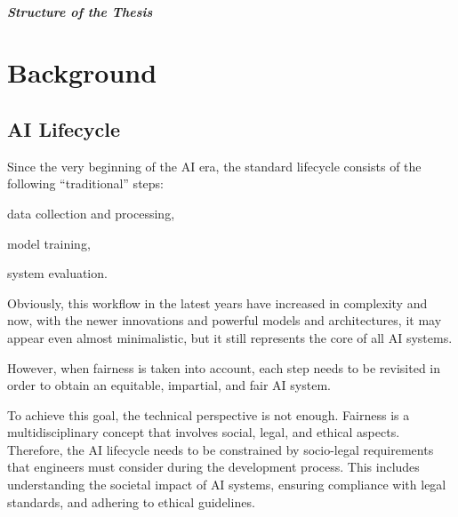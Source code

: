 \documentclass[12pt,a4paper,openright,twoside]{book}
\begin{document}
\paragraph{Structure of the Thesis}


\chapter{Background}\label{chap:background}



\section{\ac{AI} Lifecycle}


Since the very beginning of the \ac{AI} era, the standard lifecycle consists of the following ``traditional'' steps:
\begin{enumerate*}[label= (\roman*)]
    \item data collection and processing,
    \item model training,
    \item system evaluation.
\end{enumerate*}
%
Obviously, this workflow in the latest years have increased in complexity and now, with the newer innovations and powerful models and architectures, it may appear even almost minimalistic, but it still represents the core of all \ac{AI} systems.

However, when fairness is taken into account, each step needs to be revisited in order to obtain an equitable, impartial, and fair \ac{AI} system.


To achieve this goal, the technical perspective is not enough. 
Fairness is a multidisciplinary concept that involves social, legal, and ethical aspects.
%
Therefore, the \ac{AI} lifecycle needs to be constrained by socio-legal requirements that engineers must consider during the development process.
%
This includes understanding the societal impact of \ac{AI} systems, ensuring compliance with legal standards, and adhering to ethical guidelines.
\end{document}
